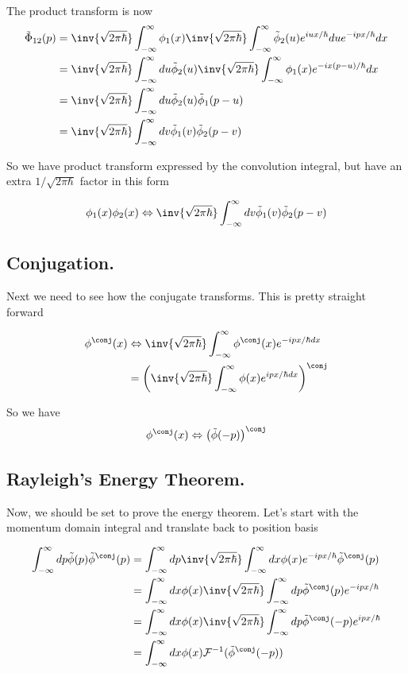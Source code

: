 \documentclass{article}
\newcommand{\FF}[0]{\mathcal{F}}
\newcommand{\FM}[0]{\inv{\sqrt{2\pi\hbar}}}
\newcommand{\Iinf}[1]{ \int_{-\infty}^\infty {#1}}
\begin{document}
The product transform is now
\begin{align*}
\tilde{\Phi}_{12}(p) 
&= \FM \Iinf{ \phi_1(x)             \FM \Iinf{\tilde{\phi}_2(u) e^{iux/\hbar} du} e^{-ipx/\hbar} dx} \\
&= \FM \Iinf{ du \tilde{\phi}_2(u)  \FM \Iinf{ \phi_1(x) e^{-ix(p-u)/\hbar} dx } } \\
&= \FM \Iinf{ du \tilde{\phi}_2(u)  \tilde{\phi}_1(p-u) } \\
&= \FM \Iinf{ dv \tilde{\phi}_1(v)  \tilde{\phi}_2(p-v)}  \\
\end{align*}

So we have product transform expressed by the convolution integral, but have an extra $1/\sqrt{2\pi\hbar}$ factor in this form

\begin{align}
\phi_1(x) \phi_2(x) \Leftrightarrow \FM \Iinf{ dv \tilde{\phi}_1(v)  \tilde{\phi}_2(p-v) } \\
\end{align}

\subsection{ Conjugation. }

Next we need to see how the conjugate transforms.  This is pretty straight forward

\begin{align*}
\phi^\conj(x) 
&\Leftrightarrow \FM \Iinf{ \phi^\conj(x) e^{-ipx/\hbar dx}} \\
&= \left(\FM \Iinf{ \phi(x) e^{ipx/\hbar dx}}\right)^\conj \\
\end{align*}

So we have
\begin{align*}
\phi^\conj(x) \Leftrightarrow \left(\tilde{\phi}(-p) \right)^\conj \\
\end{align*}

\subsection{ Rayleigh's Energy Theorem. }

Now, we should be set to prove the energy theorem.  Let's start with the 
momentum domain integral and translate back to position basis

\begin{align*}
\Iinf{ dp \tilde{\phi}(p){\tilde{\phi}}^\conj(p) } 
&= \Iinf{ dp \FM \Iinf{ dx \phi(x) e^{-ipx/\hbar}} {\tilde{\phi}}^\conj(p) }  \\
&= \Iinf{ dx \phi(x) \FM \Iinf{ dp {\tilde{\phi}}^\conj(p) } e^{-ipx/\hbar}} \\
&= \Iinf{ dx \phi(x) \FM \Iinf{ dp {\tilde{\phi}}^\conj(-p) } e^{ipx/\hbar}} \\
&= \Iinf{ dx \phi(x) \FF^{-1}( {\tilde{\phi}}^\conj(-p) )}  \\
\end{align*}
\end{document}
